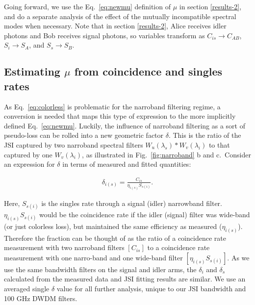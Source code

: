 \documentclass[11pt]{caltech_thesis} %
\begin{document}
Going forward, we use the Eq.~\ref{eq:newmu} definition of $\mu$ in section \ref{results-2}, and do a separate analysis of the effect of the mutually incompatible spectral modes when necessary. Note that in section \ref{results-2}, Alice receives idler photons and Bob receives signal photons, so variables transform as $C_{is} \rightarrow C_{AB}$, $S_{i} \rightarrow S_{A}$, and $S_{s} \rightarrow S_{B}$.

\hypertarget{estimating-ux3bc-from-coincidence-and-singles-rates}{%
\subsection{\texorpdfstring{Estimating \texorpdfstring{$\mu$}{mu} from coincidence and singles rates}{Estimating  from coincidence and singles rates}}\label{estimating-ux3bc-from-coincidence-and-singles-rates}}

As Eq.~\ref{eq:colorless} is problematic for the narroband filtering regime, a conversion is needed that maps this type of expression to the more implicitly defined Eq.~\ref{eq:newmu}. Luckily, the influence of narroband filtering as a sort of pseudo-loss can be rolled into a new geometric factor $\delta$. This is the ratio of the JSI captured by two narroband spectral filters $W_u(\lambda_s)*W_v(\lambda_i)$ to that captured by one $W_v(\lambda_i)$, as illustrated in Fig.~\ref{fig:narroband} b and c.~Consider an expression for $\delta$ in terms of measured and fitted quantities:

\hypertarget{eq:new_eff}{}{
\begin{align} 
    \delta_{i(s)} = \frac{C_{is}}{\eta_{i(s)}S_{s(i)}}. \label{eq:new_eff}
\end{align}
}

Here, $S_{s(i)}$ is the singles rate through a signal (idler) narrowband filter. $\eta_{i(s)}S_{s(i)}$ would be the coincidence rate if the idler (signal) filter was wide-band (or just colorless loss), but maintained the same efficiency as measured ($\eta_{i(s)}$). Therefore the fraction can be thought of as the ratio of a coincidence rate measurement with two narroband filters $[C_{is}]$ to a coincidence rate measurement with one narro-band and one wide-band filter $[\eta_{i(s)}S_{s(i)}]$. As we use the same bandwidth filters on the signal and idler arms, the $\delta_i$ and $\delta_s$ calculated from the measured data and JSI fitting results are similar. We use an averaged single $\delta$ value for all further analysis, unique to our JSI bandwidth and 100 GHz DWDM filters.
\end{document}
